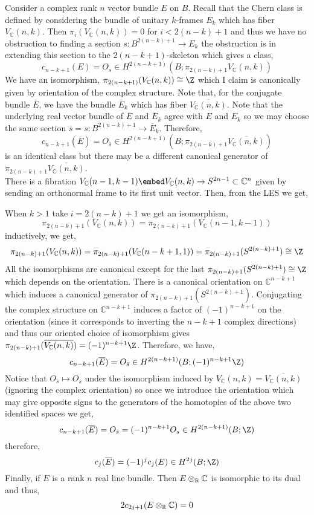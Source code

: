 \documentclass[12pt]{extarticle}
\newcommand{\C}{\mathbb{C}}
\begin{document}
Consider a complex rank $n$ vector bundle $E$ on $B$. Recall that the Chern class is defined by considering the bundle of unitary $k$-frames $E_k$ which has fiber $V_\C(n, k)$. Then $\pi_i(V_\C(n, k)) = 0$ for $i < 2(n - k) + 1$ and thus we have no obstruction to finding a section $s : B^{2(n - k) + 1} \to E_k$ the obstruction is in extending this section to the $2(n - k + 1)$-skeleton which gives a class,
\[ c_{n-k+1}(E) = O_{s} \in H^{2(n - k + 1)}(B; \pi_{2(n - k) + 1} V_\C(n, k)) \]
We have an isomorphism, $\pi_{2 (n - k + 1)} (V_\C(n, k)) \cong \Z$ which I claim is canonically given by orientation of the complex structure. Note that, for the conjugate bundle $\overline{E}$, we have the bundle $\overline{E}_k$ which has fiber $\overline{V_\C(n, k)}$. Note that the underlying real vector bundle of $\overline{E}$ and $\overline{E}_k$ agree with $E$ and $E_k$ so we may choose the same section $\bar{s} = s : B^{2(n - k) + 1} \to \overline{E}_k$. Therefore,
\[ c_{n-k+1}(\overline{E}) = O_{\bar{s}} \in H^{2(n - k + 1)}(B; \pi_{2(n - k) + 1} \overline{V_\C(n, k)}) \]
is an identical class but there may be a different canonical generator of $\pi_{2(n - k) + 1} \overline{V_\C(n, k)}$.
\bigskip\\
There is a fibration $V_\C(n-1, k-1) \embed V_\C(n, k) \to S^{2n - 1} \subset \C^{n}$ given by sending an orthonormal frame to its first unit vector. Then, from the LES we get,
\begin{center}
\end{center}
When $k > 1$ take $i = 2(n - k) + 1$ we get an isomorphism,
\[ \pi_{2(n-k)+1}(V_\C(n, k)) = \pi_{2(n - k) + 1}(V_\C(n-1, k-1)) \]
inductively, we get, 
\[ \pi_{2(n-k)+1}(V_\C(n,k)) = \pi_{2(n-k)+1}(V_\C(n-k+1,1)) = \pi_{2(n-k)+1}(S^{2(n-k) + 1}) \cong \Z \]
All the isomorphisms are canonical except for the last $\pi_{2(n-k)+1}(S^{2(n-k)+1}) \cong \Z$ which depends on the orientation. There is a canonical orientation on $\C^{n-k+1}$ which induces a canonical generator of $\pi_{2(n-k) + 1}(S^{2(n-k) + 1})$. Conjugating the complex structure on $\C^{n-k+1}$ induces a factor of $(-1)^{n-k+1}$ on the orientation (since it corresponds to inverting the $n-k+1$ complex directions) and thus our oriented choice of isomorphism gives $\pi_{2(n-k) + 1}(\overline{V_\C(n, k)}) = (-1)^{n-k+1} \Z$. Therefore, we have,
\[ c_{n-k+1}(\overline{E}) = O_{\bar{s}} \in H^{2(n-k+1)}(B; (-1)^{n-k+1} \Z) \]
Notice that $O_{\bar{s}} \mapsto O_{s}$ under the isomorphism induced by $V_\C(n, k) = \overline{V_\C(n, k)}$ (ignoring the complex orientation) so once we introduce the orientation which may give opposite signs to the generators of the homotopies of the above two identified spaces we get,
\[ c_{n-k+1}(\overline{E}) = O_{\bar{s}} = (-1)^{n-k+1} O_{s} \in H^{2(n-k+1)}(B; \Z) \]
therefore,
\[ c_j(\overline{E}) = (-1)^j c_j(E) \in H^{2j}(B; \Z) \]
Finally, if $E$ is a rank $n$ real line bundle. Then $E \otimes_\R \C$ is isomorphic to its dual and thus,
\[ 2 c_{2j+1}(E \otimes_\R \C) = 0 \]
\end{document}
